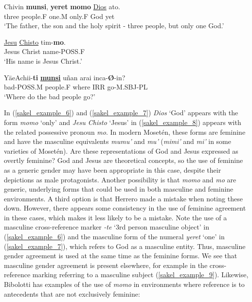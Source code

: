 \documentclass[output=paper,colorlinks,citecolor=brown
]{langscibook}
\begin{document}
     Chivin \textbf{munsi}, 		\textbf{yeret} 	\textbf{momo} 	\underline{Dios} 	ato.\\
    three	people.F	one.M	only.F	God	yet\\
\glt ‘The father, the son and the holy spirit - three people, but only one God.’
\z	

\ea \label{sakel_example_8}
\gll \underline{Jesu} \underline{Chisto} 	tim-\textbf{mo}.\\
     Jesus Christ	name-POSS.F\\
\glt ‘His name is Jesus Christ.’
\z

 \ea \label{sakel_example_9}
\gll YäeAchii-\textbf{ti} 	\textbf{\underline{munsi}} 		uñan 	arai 	inca-\textbf{Ø}-in?\\
     bad-POSS.M	people.F	where	IRR	go-M.SBJ-PL\\
\glt ‘Where do the bad people go?’
\z

In (\ref{sakel_example_6}) and (\ref{sakel_example_7}) \textit{Dios} ‘God’ appears with the form \textit{momo} ‘only’ and \textit{Jesu Chisto} ‘Jesus’ in (\ref{sakel_example_8}) appears with the related possessive pronoun \textit{mo}. In modern Mosetén, these forms are feminine and have the masculine equivalents \textit{mumu’} and \textit{mu’} (\textit{mimi’} and \textit{mi’} in some varieties of Mosetén). Are these representations of God and Jesus expressed as overtly feminine? God and Jesus are theoretical concepts, so the use of feminine as a generic gender may have been appropriate in this case, despite their depictions as male protagonists. Another possibility is that \textit{momo} and \textit{mo} are generic, underlying forms that could be used in both masculine and feminine environments. A third option is that Herrero made a mistake when noting these down. However, there appears some consistency in the use of feminine agreement in these cases, which makes it less likely to be a mistake. 
Note the use of a masculine cross-reference marker \textit{-te} ‘3rd person masculine object’ in (\ref{sakel_example_6}) and the masculine form of the numeral \textit{yeret} ‘one’ in (\ref{sakel_example_7}), which refers to God as a masculine entity. Thus, masculine gender agreement is used at the same time as the feminine forms. We see that masculine gender agreement is present elsewhere, for example in the cross-reference marking referring to a masculine subject (\ref{sakel_example_9}). 
Likewise, Bibolotti has examples of the use of \textit{momo} in environments where reference is to antecedents that are not exclusively feminine: 
\end{document}

